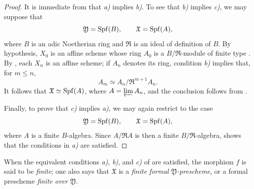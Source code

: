 \begin{proof}
It is immediate from  that \emph{a)} implies
\emph{b)}.  To see that \emph{b)} implies \emph{c)}, we may suppose
that
\[
  \mathfrak{Y}=\operatorname{Spf}(B),\qquad \mathfrak{X}=\operatorname{Spf}(A),
\]
where $B$ is an adic Noetherian ring and $\mathfrak{R}$ is an ideal
of definition of $B$.  By hypothesis, $X_0$ is an affine scheme
whose ring $A_0$ is a $B/\mathfrak{R}$-module of finite type
.  By , each $X_n$ is an affine
scheme; if $A_n$ denotes its ring, condition \emph{b)} implies that,
for $m\leq n$,
\[
  A_m\simeq A_n/\mathfrak{R}^{m+1}A_n.
\]
It follows that $\mathfrak{X}\simeq\operatorname{Spf}(A)$, where
$A=\varprojlim A_n$, and the conclusion follows from
.

Finally, to prove that \emph{c)} implies \emph{a)}, we may again
restrict to the case
\[
  \mathfrak{Y}=\operatorname{Spf}(B),\qquad \mathfrak{X}=\operatorname{Spf}(A),
\]
where $A$ is a finite $B$-algebra.  Since
$A/\mathfrak{R}A$ is then a finite
$B/\mathfrak{R}$-algebra,  shows that the
conditions in \emph{a)} are satisfied.
\end{proof}

\begin{definition}[4.8.2]
\label{III.4.8.2}
When the equivalent conditions \emph{a)}, \emph{b)}, and \emph{c)}
of  are satisfied, the morphism $f$ is said to be
\emph{finite}; one also says that $\mathfrak{X}$ is a
\emph{finite formal $\mathfrak{Y}$-prescheme}, or a formal
prescheme \emph{finite over $\mathfrak{Y}$}.
\end{definition}


